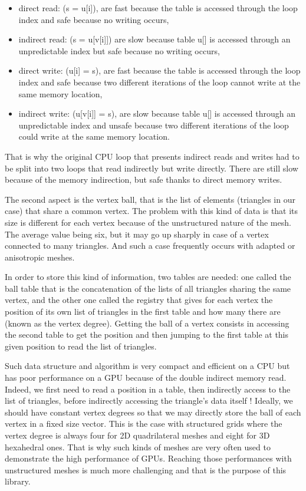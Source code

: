\documentclass[a4paper,12pt]{article}
\begin{document}
\begin{itemize}
\item direct read: (s = u[i]), are fast because the table is accessed through the loop index and safe because no writing occurs,
\item indirect read: (s = u[v[i]]) are slow because table u[] is accessed through an unpredictable index but safe because no writing occurs,
\item direct write: (u[i] = s), are fast because the table is accessed through the loop index and safe because two different iterations of the loop cannot write at the same memory location,
\item indirect write: (u[v[i]] = s), are slow because table u[] is accessed through an unpredictable index and unsafe because two different iterations of the loop could write at the same memory location.
\end{itemize}

That is why the original CPU loop that presents indirect reads and writes had to be split into two loops that read indirectly but write directly. There are still slow because of the memory indirection, but safe thanks to direct memory writes.

The second aspect is the vertex ball, that is the list of elements (triangles in our case) that share a common vertex. The problem with this kind of data is that its size is different for each vertex because of the unstructured nature of the mesh. The average value being six, but it may go up sharply in case of a vertex connected to many triangles. 
And such a case frequently occurs with adapted or anisotropic meshes.

In order to store this kind of information, two tables are needed: one called the ball table that is the concatenation of the lists of all triangles sharing the same vertex, and the other one called the registry that gives for each vertex the position of its own list of triangles in the first table and how many there are (known as the vertex degree). Getting the ball of a vertex consists in accessing the second table to get the position and then jumping to the first table at this given position to read the list of triangles.

Such data structure and algorithm is very compact and efficient on a CPU but has poor performance on a GPU because of the double indirect memory read. Indeed, we first need to read a position in a table, then indirectly access to the list of triangles, before indirectly accessing the triangle's data itself ! Ideally, we should have constant vertex degrees so that we may directly store the ball of each vertex in a fixed size vector. This is the case with structured grids where the vertex degree is always four for 2D quadrilateral meshes and eight for 3D hexahedral ones. That is why such kinds of meshes are very often used to demonstrate the high performance of GPUs. Reaching those performances with unstructured meshes is much more challenging and that is the purpose of this library.
\end{document}
